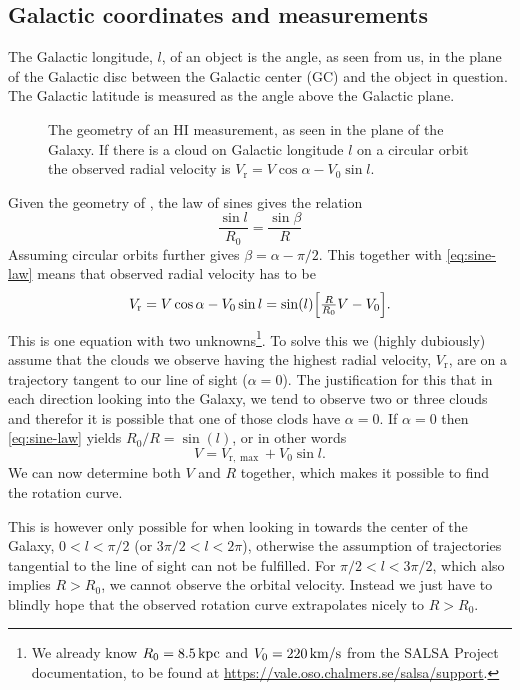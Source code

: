 \documentclass[11pt,a4paper, twocolumn,
swedish, english %
]{article}
\newcommand{\rr}{\mathrm{r}}
\begin{document}
\subsection{Galactic coordinates and measurements}
The Galactic longitude, $l$, of an object is the angle, as seen from
us, in the plane of the Galactic disc between the Galactic center (GC)
and the object in question. The Galactic latitude is measured as the
angle above the Galactic plane. 

\begin{figure}\centering
\resizebox{0.5\linewidth}{!}{
}
\caption{The geometry of an HI measurement, as seen in the plane of
  the Galaxy. If there is a cloud on Galactic longitude $l$ on a circular
  orbit the observed radial velocity is $V_\rr=V\cos\alpha-V_0\sin l$. }
\label{fig:geom}
\end{figure}

Given the geometry of , the law of sines gives the
relation
\begin{equation}\label{eq:sine-law}
\frac{\sin l}{R_0}=\frac{\sin\beta}{R}
\end{equation}
Assuming circular orbits further gives $\beta=\alpha-\pi/2$.
This together with \eqref{eq:sine-law} means that observed radial
velocity has to be
\begin{equation}\label{eq:Vr}
V_\rr=V\cos\alpha-V_0\sin l
=\sin(l)\qty[\tfrac{R}{R_0}V-V_0].
\end{equation}
This is one equation with two unknowns\footnote{We already know 
  $R_0=\unit[8.5]{kpc}$ and $V_0=\unit[220]{km/s}$ from the SALSA
  Project documentation, to be found at
  \url{https://vale.oso.chalmers.se/salsa/support}.}.
To solve this we (highly dubiously) assume that the clouds we observe
having the highest radial velocity, $V_\rr$, are on a trajectory
tangent to our line of sight ($\alpha=0$). The justification for this
that in each direction looking into the Galaxy, we tend to observe two
or three clouds and therefor it is possible that one of those clods
have $\alpha=0$. If $\alpha=0$ then \eqref{eq:sine-law} yields
$R_0/R=\sin(l)$, or in other words
\begin{equation}\label{eq:Vrmax}
V=V_{\rr,\max}+V_0\sin l.
\end{equation}
We can now determine both $V$ and $R$ together, which makes it
possible to find  the rotation curve.

This is however only possible for when looking in towards the center
of the Galaxy, $0<l<\pi/2$ (or $3\pi/2<l<2\pi$), otherwise the
assumption of trajectories tangential to the line of sight can not be
fulfilled. For $\pi/2<l<3\pi/2$, which also implies $R>R_0$, we cannot
observe the orbital velocity. Instead we just have to blindly hope
that the observed rotation curve extrapolates nicely to $R>R_0$.
\end{document}
